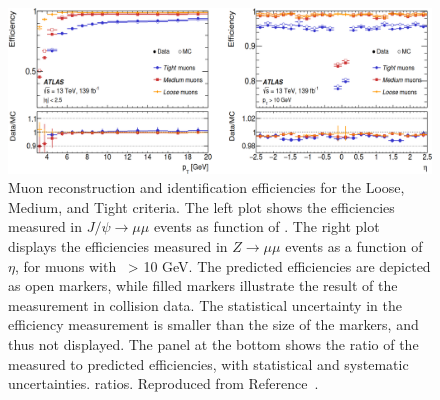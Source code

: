 \begin{figure}[bht]
    \begin{centering}	
    \includegraphics[width=1.0\textwidth]{Reconstruction/plots/muon_ID.png}
    \caption{
        Muon reconstruction and identification efficiencies for the Loose, Medium, and Tight criteria. 
        The left plot shows the efficiencies measured in $J/\psi \rightarrow \mu\mu$ events as function of \pt. 
        The right plot displays the efficiencies measured in $Z \rightarrow \mu\mu$ events as a function of $\eta$, 
        for muons with \pt\ > 10 GeV. The predicted efficiencies are depicted as open markers, 
        while filled markers illustrate the result of the measurement in collision data. 
        The statistical uncertainty in the efficiency measurement is smaller than the size of the markers, 
        and thus not displayed. The panel at the bottom shows the ratio of the measured to predicted efficiencies, 
        with statistical and systematic uncertainties.
    ratios. Reproduced from Reference~\cite{CERN-EP-2020-199}.}
    \label{fig:muon_ID}
    \end{centering}
\end{figure}
